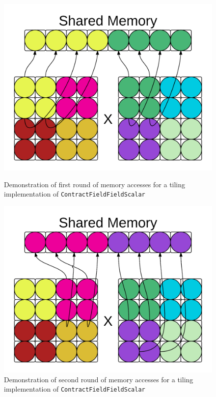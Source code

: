 \begin{figure}[!ht]
    \centering
    \includegraphics[scale = .4]{SharedMem1.png}
    \caption[Memory accesses -- First Tiling Team]{Demonstration of first round of memory
        accesses for a tiling implementation of \texttt{ContractFieldFieldScalar}}
    
    \includegraphics[scale = .4]{SharedMem2.png} \caption[Memory accesses --
    Second Tiling Team]{Demonstration of second round of memory accesses for a tiling
        implementation of \texttt{ContractFieldFieldScalar}}
\label{fig:Tiling}
\end{figure}

